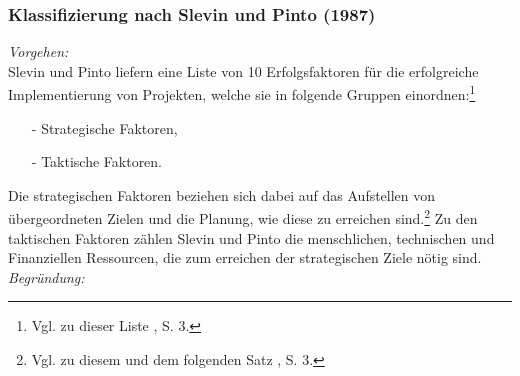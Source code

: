 \noindent
\subsubsection{Klassifizierung nach Slevin und Pinto (1987)}
\textit{Vorgehen:}\\\noindent
Slevin und Pinto liefern eine Liste von 10 Erfolgsfaktoren für die erfolgreiche Implementierung von Projekten, welche sie in folgende
Gruppen einordnen:\footnote{Vgl. zu dieser Liste \cite{Slevin.1987}, S. 3.}
\begin{itemize}\itemsep0pt
\item[-]Strategische Faktoren,
\item[-]Taktische Faktoren.
\end{itemize}
Die strategischen Faktoren beziehen sich dabei auf das Aufstellen von übergeordneten Zielen und die Planung, wie diese zu erreichen sind.\footnote{Vgl. zu diesem und dem folgenden Satz \cite{Slevin.1987}, S. 3.}
Zu den taktischen Faktoren zählen Slevin und Pinto die menschlichen, technischen und Finanziellen Ressourcen, die zum erreichen der
strategischen Ziele nötig sind.
\\\noindent\textit{Begründung:}\\\noindent
